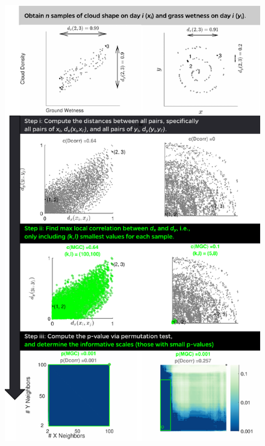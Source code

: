 \documentclass[11pt]{article}
\begin{document}
\begin{figure}
\includegraphics[height=1.0\textheight]{Figures/Fig1Allb.pdf}
\caption{}
\label{f:newschem}
\end{figure}
\end{document}
